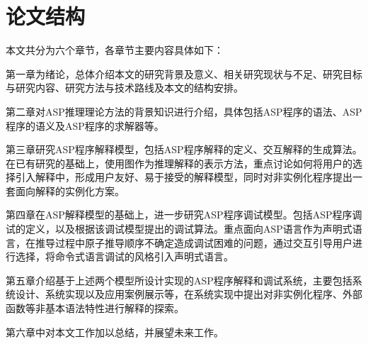 \section{论文结构}
本文共分为六个章节，各章节主要内容具体如下： 

第一章为绪论，总体介绍本文的研究背景及意义、相关研究现状与不足、研究目标与研究内容、研究方法与技术路线及本文的结构安排。

第二章对ASP推理理论方法的背景知识进行介绍，具体包括ASP程序的语法、ASP程序的语义及ASP程序的求解器等。

第三章研究ASP程序解释模型，包括ASP程序解释的定义、交互解释的生成算法。在已有研究的基础上，使用图作为推理解释的表示方法，重点讨论如何将用户的选择引入解释中，形成用户友好、易于接受的解释模型，同时对非实例化程序提出一套面向解释的实例化方案。

第四章在ASP解释模型的基础上，进一步研究ASP程序调试模型。包括ASP程序调试的定义，以及根据该调试模型提出的调试算法。重点面向ASP语言作为声明式语言，在推导过程中原子推导顺序不确定造成调试困难的问题，通过交互引导用户进行选择，将命令式语言调试的风格引入声明式语言。

第五章介绍基于上述两个模型所设计实现的ASP程序解释和调试系统，主要包括系统设计、系统实现以及应用案例展示等，在系统实现中提出对非实例化程序、外部函数等非基本语法特性进行解释的探索。

第六章中对本文工作加以总结，并展望未来工作。